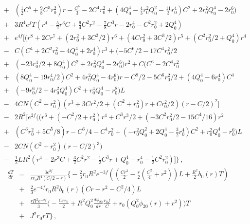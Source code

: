 \documentclass[aps,prd,12pt,superscriptaddress]{revtex4-2}
\begin{document}
\begin{eqnarray}
     \nonumber 
    \\
    &+&(\frac{1}{2} {C}^{5}+\frac{9}{8} {C}^{3} r_0^{2}) r -\frac{{C}^{6}}{3}-2 {C}^{4} r_0^{2}+(4 Q_0^{4}-\frac{4}{3} r_0^{2} Q_0^{2}-\frac{11}{3} r_0^{4}) {C}^{2}
    +2 r_0^{2} Q_0^{4}-2 r_0^{6}
    \big) 
     \nonumber 
    \\
    &+& 3 R^4
    {e}^{f} T 
    (r^{4}-\frac{5}{2} r^{3} {C} +\frac{9}{4} {C}^{2} r^{2}-\frac{7}{8} {C}^{3} r -2 r_0^{4}-{C}^{2} r_0^{2}+2 Q_0^{4})
     \nonumber 
    \\
    &+&
    {e}^{4f}
    \big[(r^{8}+2 {C} r^{7}+(2 r_0^{2}
    +3 {C}^{2}/2) r^{6}
    +(4 {C} r_0^{2}
    +3 {C}^{3}/2) r^{5}
    +({C}^{2} r_0^{2}/2+Q_0^{4}) r^{4}
     \nonumber 
     \\
    &-& {C} ({C}^{4}+2 {C}^{2} r_0^{2}-4 Q_0^{4}+2 r_0^{4}) r^{3}+(-5 {C}^{6}/2
    - 17 {C}^{4} r_0^{2}/2
     \nonumber 
    \\
   & +& (-23 r_0^{4}/2+8 Q_0^{4}) {C}^{2}+2 r_0^{2} Q_0^{4}-2 r_0^{6}) r^{2}+{C} ({C}^{6}-2 {C}^{4} r_0^{2}
     \nonumber 
    \\
    &+& (8 Q_0^{4}-19 r_0^{4}/2 ) {C}^{2}+4 r_0^{2} Q_0^{4}-4 r_0^{6}) r -{C}^{8}/2
    -5 {C}^{6} r_0^{2}/2
    +(4 Q_0^{4}-6 r_0^{4}) {C}^{4}
     \nonumber 
    \\
    &+& (-9 r_0^{6} /2+4 r_0^{2} Q_0^{4}) {C}^{2}+r_0^{4} Q_0^{4}-r_0^{8}) L 
      \nonumber 
    \\
   & -& 4 {C} N ({C}^{2}+r_0^{2})
    (r^{3}+ 3 {C} r^{2}/2+({C}^{2}+r_0^{2}) r + {C} r_0^{2}/2 ) \left(r -C/2 \right)^{2}
    \big] 
     \nonumber 
    \\
    &-& 2R^2 \big[ {e}^{2f}
    \big(
    (r^{6}+(-{C}^{2}/2+r_0^{2}) r^{4}+{C}^{3} r^{3}/2+(-3 {C}^{2} r_0^{2}/2
    -15 {C}^{4}/16) r^{2}
     \nonumber 
    \\
    &+& ({C}^{3} r_0^{2}
    +5 {C}^{5}/8) r -C^6/4-{C}^{4} r_0^{2}+(-r_0^{2} Q_0^{2}+2 Q_0^{4}-\frac{3}{2} r_0^{4}) {C}^{2}+r_0^{2} Q_0^{4}-r_0^{6}) L
     \nonumber 
     \\
    &-& 2 {C} N ({C}^{2}+r_0^{2}) \left(r -C/2 \right)^{3}\big) 
     \nonumber 
    \\
    &-&
     \frac{1}{2}L R^2 (r^{4}-2 r^{3} {C} +\frac{3}{2} {C}^{2} r^{2}-\frac{1}{2} {C}^{3} r +Q_0^{4}-r_0^{4}-\frac{1}{2} {C}^{2} r_0^{2})
    \big]
\big\} \, ,
    \label{dN_withc}
\end{eqnarray}
\begin{eqnarray}
    \frac{dT}{dr}
    &=& \frac{3e^{2f}}{rr_0R^4(C/2 - r)} 
    \big\{ 
-\frac{2}{3} r_0R^2 e^{-3f}
(
(\frac{Cr^2}{2}
-\frac{r}{2} (\frac{C^2}{4}+r^2)
)L
+ \frac{R^2}{2}b_0(r)T
)
\nonumber
\\
&+&
\frac{2}{3}
e^{-4f} r_0R^2b_0(r) 
(Cr-r^2-C^2/4)
L
\nonumber
\\
&+& 
\frac{rR^2e^{-2f}}{3}
\big(
-\frac{Crr_0}{2}
+
R^2
Q_0^2
\frac{d\phi_{20}}{dr}
\frac{r_0 f}{C}
+r_0(Q_0^2\phi_{20}(r) + r^2)
\big)
T
\nonumber
\\
&+& J^2 r_0 r T
   \big\} \, ,
   \label{dT_withc}
\end{eqnarray}
\end{document}
